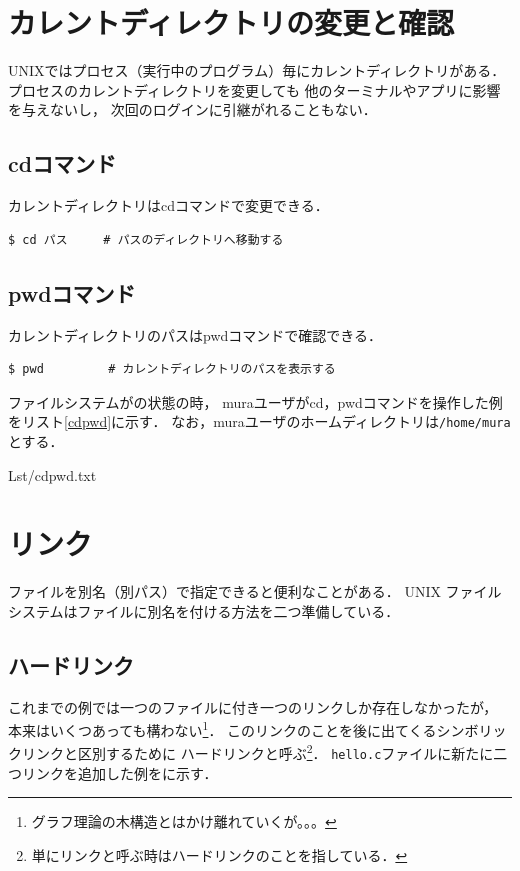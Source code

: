 \section{カレントディレクトリの変更と確認}
UNIXではプロセス（実行中のプログラム）毎にカレントディレクトリがある．
プロセスのカレントディレクトリを変更しても
他のターミナルやアプリに影響を与えないし，
次回のログインに引継がれることもない．

\subsection*{cdコマンド}
カレントディレクトリはcdコマンドで変更できる．

\begin{lstlisting}[numbers=none]
$ cd パス     # パスのディレクトリへ移動する
\end{lstlisting}

\subsection*{pwdコマンド}
カレントディレクトリのパスはpwdコマンドで確認できる．

\begin{lstlisting}[numbers=none]
$ pwd         # カレントディレクトリのパスを表示する
\end{lstlisting}

ファイルシステムがの状態の時，
muraユーザがcd，pwdコマンドを操作した例をリスト\ref{cdpwd}に示す．
なお，muraユーザのホームディレクトリは\texttt{/home/mura}とする．


                {Lst/cdpwd.txt}

\section{リンク}
ファイルを別名（別パス）で指定できると便利なことがある．
UNIX ファイルシステムはファイルに別名を付ける方法を二つ準備している．

\subsection{ハードリンク}
これまでの例では一つのファイルに付き一つのリンクしか存在しなかったが，
本来はいくつあっても構わない\footnote{
グラフ理論の木構造とはかけ離れていくが。。。}．
このリンクのことを後に出てくるシンボリックリンクと区別するために
ハードリンクと呼ぶ\footnote{
単にリンクと呼ぶ時はハードリンクのことを指している．}．
\texttt{hello.c}ファイルに新たに二つリンクを追加した例をに示す．

